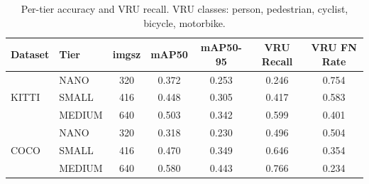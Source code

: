 \begin{table}[t]
\centering
\caption{Per-tier accuracy and VRU recall. VRU classes: person, pedestrian, cyclist, bicycle, motorbike.}
\label{tab:accuracy_per_tier}
\begin{tabular}{llccccc}
\toprule
Dataset & Tier & imgsz & mAP50 & mAP50-95 & VRU Recall & VRU FN Rate \\
\midrule
\multirow{3}{*}{KITTI} & NANO & 320 & 0.372 & 0.253 & 0.246 & 0.754 \\
 & SMALL & 416 & 0.448 & 0.305 & 0.417 & 0.583 \\
 & MEDIUM & 640 & 0.503 & 0.342 & 0.599 & 0.401 \\
\midrule
\multirow{3}{*}{COCO} & NANO & 320 & 0.318 & 0.230 & 0.496 & 0.504 \\
 & SMALL & 416 & 0.470 & 0.349 & 0.646 & 0.354 \\
 & MEDIUM & 640 & 0.580 & 0.443 & 0.766 & 0.234 \\
\bottomrule
\end{tabular}
\end{table}